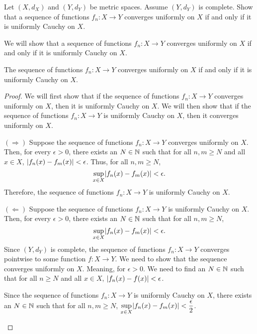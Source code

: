 \begin{problem}
  Let $(X, d_X)$ and $(Y, d_Y)$ be metric spaces.
  Assume $(Y, d_Y)$ is complete.
  Show that a sequence of functions $f_n : X \to Y$ converges uniformly
  on $X$ if and only if it is uniformly Cauchy on $X$.
\end{problem}

\begin{answer}
  We will show that a sequence of functions $f_n : X \to Y$ converges uniformly
  on $X$ if and only if it is uniformly Cauchy on $X$.

  \begin{claim}
    The sequence of functions $f_n : X \to Y$ converges uniformly on $X$
    if and only if it is uniformly Cauchy on $X$.
    \begin{proof}
      We will first show that if the sequence of functions $f_n : X \to Y$
      converges uniformly on $X$, then it is uniformly Cauchy on $X$.
      We will then show that if the sequence of functions $f_n : X \to Y$
      is uniformly Cauchy on $X$, then it converges uniformly on $X$.
      \begin{enumarabic}
        \item $(\Longrightarrow)$
        Suppose the sequence of functions $f_n : X \to Y$ converges uniformly on $X$.
        Then, for every $\epsilon > 0$, there exists an $N \in \mathbb{N}$ such that
        for all $n, m \geq N$ and all $x \in X$, $\lvert f_n(x) - f_m(x)\rvert < \epsilon$.
        Thus, for all $n, m \geq N$,
        \[ \displaystyle \sup_{x \in X} \lvert f_n(x) - f_m(x)\rvert < \epsilon. \]
        Therefore, the sequence of functions $f_n : X \to Y$ is uniformly Cauchy on $X$.
  
        \step
        \item $(\Longleftarrow)$
        Suppose the sequence of functions $f_n : X \to Y$ is uniformly Cauchy on $X$.
        Then, for every $\epsilon > 0$, there exists an $N \in \mathbb{N}$ such that
        for all $n, m \geq N$,
        \[ \sup_{x \in X} \lvert f_n(x) - f_m(x)\rvert < \epsilon. \]
        Since $(Y, d_Y)$ is complete, the sequence of functions $f_n : X \to Y$
        converges pointwise to some function $f : X \to Y$.
        We need to show that the sequence converges uniformly on $X$.
        Meaning, for $\epsilon > 0$.
        We need to find an $N \in \mathbb{N}$ such that for all $n \geq N$ and all $x \in X$,
        $\lvert f_n(x) - f(x)\rvert < \epsilon$.
  
        \step
        \begin{enumarabic}
          \item
            Since the sequence of functions $f_n : X \to Y$ is uniformly Cauchy on $X$,
            there exists an $N \in \mathbb{N}$ such that for all $n, m \geq N$,
            $\displaystyle \sup_{x \in X} \lvert f_n(x) - f_m(x)\rvert < \frac{\epsilon}{2}$.
          

\end{enumarabic}
\end{enumarabic}
\end{proof}
\end{claim}
\end{answer}
